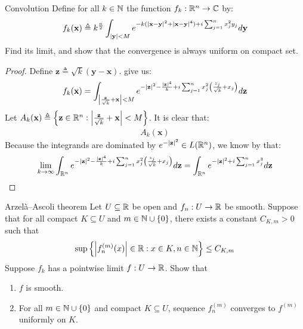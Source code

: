 \documentclass{report}
\begin{document}
\begin{question}{Convolution}{}
Define for all $k\in\mathbb{N}$ the function $f_k:\mathbb{R}^n \rightarrow \mathbb{C}$ by: 
\begin{align*}
f_k (\textbf{x})\triangleq k^{\frac{n}{2}}\int_{ \left|\textbf{y}\right|<M} e^{-k (\left|\textbf{x}-\textbf{y}\right|^2 + \left|\textbf{x}-\textbf{y}\right|^4)+ i \sum_{j=1}^n x_j^2y_j } d\textbf{y}
\end{align*}
Find its limit, and show that the convergence is always uniform on compact set.   
\end{question}
\begin{proof}
Define $\textbf{z} \triangleq \sqrt{k} (\textbf{y}-\textbf{x})$.  give us: 
\begin{align*}
f_k(\textbf{x})= \int_{\left|\frac{\textbf{z}}{\sqrt{k} }+ \textbf{x}\right| < M} e^{- \left|\textbf{z}\right|^2  - \frac{\left|\textbf{z}\right|^4}{k}+ i \sum_{j=1}^n x_j^2 \left(\frac{z_j}{\sqrt{k} }+ x_j \right)}  d\textbf{z}
\end{align*}
Let $A_k(\textbf{x})\triangleq \left\{ \textbf{z}\in\mathbb{R}^n : \left|\frac{\textbf{z}}{\sqrt{k} }+\textbf{x}\right|<M \right\}$. It is clear that: 
\begin{align*}
A_k(\textbf{x})
\end{align*}
Because the integrands are dominated by $e^{- \left|\textbf{z}\right|^2} \in L(\mathbb{R}^n)$, we know by  that: 
\begin{align*}
\lim_{k\to \infty}   \int_{\mathbb{R}^n} e^{- \left|\textbf{z}\right|^2  - \frac{\left|\textbf{z}\right|^4}{k}+ i \sum_{j=1}^n x_j^2 \left(\frac{z_j}{\sqrt{k} }+ x_j \right)}  d\textbf{z} = \int_{\mathbb{R}^n} e^{- \left|\textbf{z}\right|^2 + i \sum_{j=1}^n x_j^3} d\textbf{z}
\end{align*}

\end{proof}
\begin{question}{Arzelà–Ascoli theorem}{}
Let $U\subseteq \mathbb{R}$ be open and $f_n:U \rightarrow \mathbb{R}$ be smooth. Suppose that for all compact $K \subseteq U$ and $m \in\mathbb{N}\cup  \left\{ 0 \right\}$, there exists a constant $C_{K,m}>0$ such that 
\begin{align*}
\operatorname{sup} \left\{ \left| f_n^{(m)}(x) \right| \in\mathbb{R}: x\in K, n \in\mathbb{N} \right\}  \leq C_{K,m}
\end{align*}
Suppose $f_k$ has a pointwise limit $f:U\rightarrow \mathbb{R}$. Show that 
\begin{enumerate}[label=(\roman*)]
  \item $f$ is smooth. 
  \item For all $m \in\mathbb{N} \cup  \left\{ 0 \right\}$ and compact $K \subseteq U$, sequence $f^{(m)}_n$ converges to $f^{(m)}$  uniformly on $K$. 
\end{enumerate}
\end{question}
\end{document}
